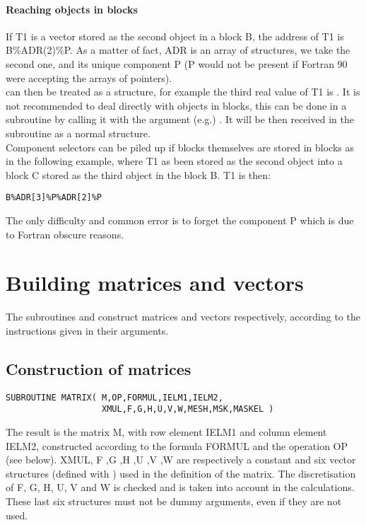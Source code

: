 \paragraph{Reaching objects in blocks}

If T1 is a vector stored as the second object in a block B, the address of T1
is B\%ADR(2)\%P. As a matter of fact, ADR is an array of
 structures, we take the second one, and its unique
component P (P would not be present if Fortran 90 were accepting the arrays of
pointers).
\\
 can then be treated as a  structure,
  for example the third real value of T1 is . It is
    not recommended to deal directly with objects in blocks, this can be done
    in a subroutine by calling it with the argument (e.g.)
    . It will be then received in the subroutine as a
      normal  structure.
\\
Component selectors can be piled up if blocks themselves are stored in blocks
as in the following example, where T1 as been stored as the second object into
a block C stored as the third object in the block B. T1 is then:

\begin{lstlisting}[language=TelFortran]
B%ADR[3]%P%ADR[2]%P
\end{lstlisting}
The only difficulty and common error is to forget the component P which is due
to Fortran obscure reasons.

\section{Building matrices and vectors}
\label{ref:matvec}

The subroutines  and  construct matrices and
vectors respectively, according to the instructions given in their arguments.

\subsection{Construction of matrices}

\begin{lstlisting}[language=TelFortran]
SUBROUTINE MATRIX( M,OP,FORMUL,IELM1,IELM2,
                   XMUL,F,G,H,U,V,W,MESH,MSK,MASKEL )
\end{lstlisting}
The result is the matrix M, with row element IELM1 and column element IELM2,
constructed according to the formula FORMUL and the operation OP (see below).
XMUL, F ,G ,H ,U ,V ,W are respectively a constant and six vector structures
(defined with ) used in the definition of the matrix. The
discretisation of F, G, H, U, V and W is checked and is taken into account in
the calculations. These last six structures must not be dummy arguments, even
if they are not used.


